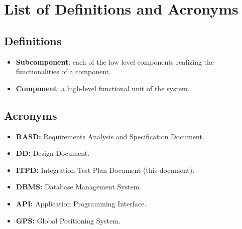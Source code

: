 \section{List of Definitions and Acronyms}
\subsection{Definitions}
\begin{itemize}
\item \textbf{Subcomponent}: each of the low level components realizing the functionalities of a component. 
\item \textbf{Component}: a high-level functional unit of the system.
\end{itemize}
\subsection{Acronyms}
\begin{itemize}
\item \textbf{RASD:} Requirements Analysis and Specification Document.
\item \textbf{DD:} Design Document.
\item \textbf{ITPD:} Integration Test Plan Document (this document).
\item \textbf{DBMS:} Database Management System.
\item \textbf{API:} Application Programming Interface.
\item \textbf{GPS:} Global Positioning System.
\end{itemize}


